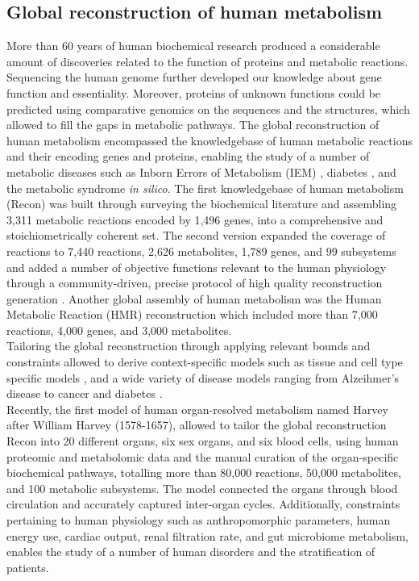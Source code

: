 \subsection{Global reconstruction of human metabolism}
More than 60 years of human biochemical research produced a considerable amount of discoveries related to the function of proteins and metabolic reactions. Sequencing the human genome further developed our knowledge about gene function and essentiality. Moreover, proteins of unknown functions could be predicted using comparative genomics on the sequences and the structures, which allowed to fill the gaps in metabolic pathways. The global reconstruction of human metabolism encompassed the knowledgebase of human metabolic reactions and their encoding genes and proteins, enabling the study of a number of metabolic diseases such as Inborn Errors of Metabolism (IEM) \cite{sahoo2012compendium}, diabetes \cite{thiele2005candidate}, and the metabolic syndrome \cite{mardinoglu2014defining} \textit{in silico}. The first knowledgebase of human metabolism (Recon) \cite{duarte2007global} was built through surveying the biochemical literature and assembling 3,311 metabolic reactions encoded by 1,496 genes, into a comprehensive and stoichiometrically coherent set. The second version \cite{thiele2013community,swainston2016recon} expanded the coverage of reactions to 7,440 reactions,  2,626 metabolites, 1,789 genes, and 99 subsystems and added a number of objective functions relevant to the human physiology through a community-driven, precise protocol of high quality reconstruction generation \cite{thiele2010protocol}. Another global assembly of human metabolism was the Human Metabolic Reaction (HMR) \cite{mardinoglu2013integration,mardinoglu2014genome} reconstruction which included more than 7,000 reactions, 4,000 genes, and 3,000 metabolites.\\
Tailoring the global reconstruction through applying relevant bounds and constraints allowed to derive context-specific models such as tissue and cell type specific models \cite{schultz2016reconstruction,yizhak2014phenotype}, and a wide variety of disease models ranging from Alzeihmer's disease \cite{stempler2014integrating} to cancer \cite{folger2011predicting} and diabetes \cite{thiele2005candidate}.\\
Recently, the first model of human organ-resolved metabolism \cite{thiele2018metabolism} named Harvey after William Harvey (1578-1657), allowed to tailor the global reconstruction Recon into 20 different organs, six sex organs, and six blood cells, using human proteomic and metabolomic data and the manual curation of the organ-specific biochemical pathways, totalling more than 80,000 reactions, 50,000 metabolites, and 100 metabolic subsystems. The model connected the organs through blood circulation and accurately captured inter-organ cycles. Additionally, constraints pertaining to human physiology such as anthropomorphic parameters, human energy use, cardiac output, renal filtration rate, and gut microbiome metabolism, enables the study of a number of human disorders and the stratification of patients.\\
